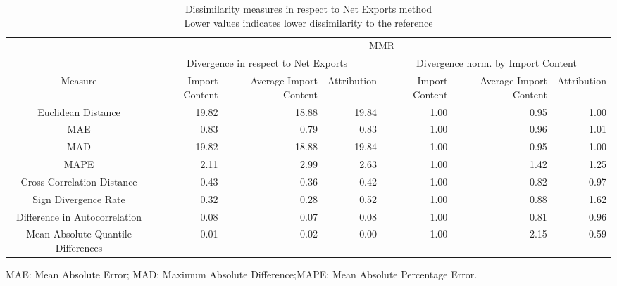 \begin{table}[t]
\caption*{
{\large Dissimilarity measures in respect to Net Exports method} \\ 
{\small Lower values indicates lower dissimilarity to the reference}
} 
\fontsize{15.0pt}{18.0pt}\selectfont
\begin{tabular*}{\linewidth}{@{\extracolsep{\fill}}crrrrrr}
\toprule
 & \multicolumn{6}{c}{MMR} \\ 
\cmidrule(lr){2-7}
 & \multicolumn{3}{c}{Divergence in respect to Net Exports} & \multicolumn{3}{c}{Divergence norm. by Import Content} \\ 
\cmidrule(lr){2-4} \cmidrule(lr){5-7}
Measure & Import Content & Average Import Content & Attribution & Import Content & Average Import Content & Attribution \\ 
\midrule\addlinespace[2.5pt]
Euclidean Distance & 19.82 & 18.88 & 19.84 & 1.00 & 0.95 & 1.00 \\ 
MAE & 0.83 & 0.79 & 0.83 & 1.00 & 0.96 & 1.01 \\ 
MAD & 19.82 & 18.88 & 19.84 & 1.00 & 0.95 & 1.00 \\ 
MAPE & 2.11 & 2.99 & 2.63 & 1.00 & 1.42 & 1.25 \\ 
Cross-Correlation Distance & 0.43 & 0.36 & 0.42 & 1.00 & 0.82 & 0.97 \\ 
Sign Divergence Rate & 0.32 & 0.28 & 0.52 & 1.00 & 0.88 & 1.62 \\ 
Difference in Autocorrelation & 0.08 & 0.07 & 0.08 & 1.00 & 0.81 & 0.96 \\ 
Mean Absolute Quantile Differences & 0.01 & 0.02 & 0.00 & 1.00 & 2.15 & 0.59 \\ 
\bottomrule
\end{tabular*}
\begin{minipage}{\linewidth}
MAE: Mean Absolute Error; MAD: Maximum Absolute Difference;MAPE: Mean Absolute Percentage Error.\\
\end{minipage}
\end{table}

